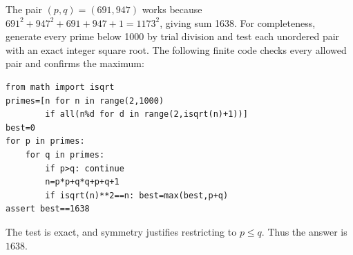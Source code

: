 The pair $(p,q)=(691,947)$ works because $691^2+947^2+691+947+1=1173^2$, giving sum 1638. For completeness, generate every prime below 1000 by trial division and test each unordered pair with an exact integer square root. The following finite code checks every allowed pair and confirms the maximum:\begin{verbatim}
from math import isqrt
primes=[n for n in range(2,1000)
        if all(n%d for d in range(2,isqrt(n)+1))]
best=0
for p in primes:
    for q in primes:
        if p>q: continue
        n=p*p+q*q+p+q+1
        if isqrt(n)**2==n: best=max(best,p+q)
assert best==1638
\end{verbatim}
The test is exact, and symmetry justifies restricting to $p\le q$. Thus the answer is $\boxed{1638}$.
